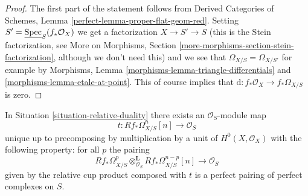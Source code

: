 \begin{proof}
The first part of the statement follows from
Derived Categories of Schemes, Lemma \ref{perfect-lemma-proper-flat-geom-red}.
Setting $S' = \underline{\mathop{\mathrm{Spec}}}_S(f_*\mathcal{O}_X)$ we get a factorization
$X \to S' \to S$ (this is the Stein factorization, see
More on Morphisms, Section \ref{more-morphisms-section-stein-factorization},
although we don't need this)
and we see that $\Omega_{X/S} = \Omega_{X/S'}$ for example by
Morphisms, Lemma \ref{morphisms-lemma-triangle-differentials} and
\ref{morphisms-lemma-etale-at-point}. This of course implies that
$\text{d} : f_*\mathcal{O}_X \to f_*\Omega_{X/S}$ is zero.
\end{proof}

\begin{lemma}
\label{lemma-relative-duality-hodge}
In Situation \ref{situation-relative-duality} there exists an
$\mathcal{O}_S$-module map
$$
t : Rf_*\Omega^n_{X/S}[n] \longrightarrow \mathcal{O}_S
$$
unique up to precomposing by multiplication by a unit of
$H^0(X, \mathcal{O}_X)$ with the following property: for all $p$ the pairing
$$
Rf_*\Omega^p_{X/S}
\otimes_{\mathcal{O}_S}^\mathbf{L}
Rf_*\Omega^{n - p}_{X/S}[n]
\longrightarrow
\mathcal{O}_S
$$
given by the relative cup product composed with $t$
is a perfect pairing of perfect complexes on $S$.
\end{lemma}

